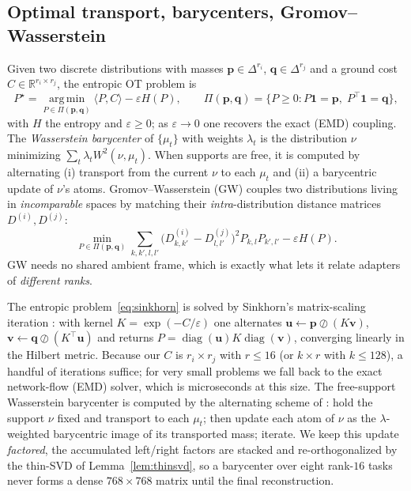 \documentclass[11pt]{article}
\newcommand{\R}{\mathbb{R}}
\newcommand{\diag}{\operatorname{diag}}
\newcommand{\argmin}{\operatorname*{arg\,min}}
\begin{document}
\subsection{Optimal transport, barycenters, Gromov--Wasserstein}
Given two discrete distributions with masses $\bm{p}\in\Delta^{r_i}$, $\bm{q}\in\Delta^{r_j}$ and a
ground cost $C\in\R^{r_i\times r_j}$, the entropic OT problem \citep{cuturi2013sinkhorn} is
\begin{equation}
P^\star = \argmin_{P\in\Pi(\bm p,\bm q)} \langle P, C\rangle - \varepsilon H(P),
\qquad \Pi(\bm p,\bm q)=\{P\ge 0: P\mathbf 1 = \bm p,\; P^\top\mathbf 1 = \bm q\},
\label{eq:sinkhorn}
\end{equation}
with $H$ the entropy and $\varepsilon\ge 0$; as $\varepsilon\to 0$ one recovers the exact (EMD) coupling.
The \emph{Wasserstein barycenter} \citep{agueh2011barycenters} of $\{\mu_t\}$ with weights $\lambda_t$ is
the distribution $\nu$ minimizing $\sum_t \lambda_t W^2(\nu,\mu_t)$. When supports are free, it is
computed by alternating (i) transport from the current $\nu$ to each $\mu_t$ and (ii) a barycentric
update of $\nu$'s atoms. Gromov--Wasserstein (GW) \citep{memoli2011gromov,peyre2016gromov} couples two
distributions living in \emph{incomparable} spaces by matching their \emph{intra}-distribution distance
matrices $D^{(i)},D^{(j)}$:
\begin{equation}
\min_{P\in\Pi(\bm p,\bm q)} \sum_{k,k',l,l'} \big(D^{(i)}_{k,k'}-D^{(j)}_{l,l'}\big)^2 P_{k,l}P_{k',l'}
- \varepsilon H(P).
\label{eq:gw}
\end{equation}
GW needs no shared ambient frame, which is exactly what lets it relate adapters of \emph{different
ranks}.

The entropic problem~\eqref{eq:sinkhorn} is solved by Sinkhorn's matrix-scaling iteration
\citep{cuturi2013sinkhorn}: with kernel $K=\exp(-C/\varepsilon)$ one alternates
$\bm u\leftarrow \bm p \oslash (K\bm v)$, $\bm v\leftarrow \bm q\oslash(K^\top\bm u)$ and returns
$P=\diag(\bm u)K\diag(\bm v)$, converging linearly in the Hilbert metric. Because our $C$ is
$r_i\times r_j$ with $r\le16$ (or $k\times r$ with $k\le128$), a handful of iterations suffice; for very
small problems we fall back to the exact network-flow (EMD) solver, which is microseconds at this size.
The free-support Wasserstein barycenter is computed by the alternating scheme of
\citet{agueh2011barycenters,peyre2019computational}: hold the support $\nu$ fixed and transport to each
$\mu_t$; then update each atom of $\nu$ as the $\lambda$-weighted barycentric image of its transported
mass; iterate. We keep this update \emph{factored}, the accumulated left/right factors are stacked and
re-orthogonalized by the thin-SVD of Lemma~\ref{lem:thinsvd}, so a barycenter over eight rank-$16$
tasks never forms a dense $768\times768$ matrix until the final reconstruction.
\end{document}

